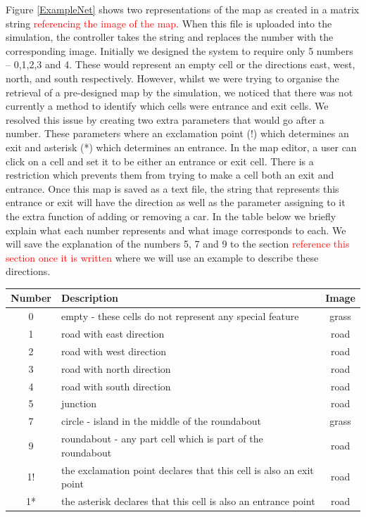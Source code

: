 \documentclass{article}
\begin{document}
Figure \ref{ExampleNet} shows two representations of the map as created in a matrix string \textcolor{red}{referencing the image of the map}. When this file is uploaded into the simulation, the controller takes the string and replaces the number with the corresponding image. Initially we designed the system to require only 5 numbers -- 0,1,2,3 and 4. These would represent an empty cell or the directions east, west, north, and south respectively. However, whilst we were trying to organise the retrieval  of a pre-designed map by the simulation, we noticed that there was not currently a method to identify which cells were entrance and exit cells. We resolved this issue by creating two extra parameters that would go after a number. These parameters where an exclamation point (!) which determines an exit and asterisk (*) which determines an entrance. In the map editor, a user can click on a cell and set it to be either an entrance or exit cell. There is a restriction which prevents them from trying to make a cell both an exit and entrance. Once this map is saved as a text file, the string that represents this entrance or exit will have the direction as well as the parameter assigning to it the extra function of adding or removing a car. In the table below we briefly explain what each number represents and what image corresponds to each. We will save the explanation of the numbers 5, 7 and 9 to the section \textcolor{red}{reference this section once it is written} where we will use an example to describe these directions. 

\vspace{0.5cm}
\begin{center}
\begin{tabular}{|c|l|c|}

\hline {\bf Number} & {\bf Description} & {\bf Image} \\ 
\hline 0 & empty - these cells do not represent any special feature & grass \\ 
\hline 1 & road with east direction & road \\ 
\hline 2 & road with west direction & road \\ 
\hline 3 & road with north direction & road \\ 
\hline 4 & road with south direction & road \\ 
\hline 5 & junction & road \\ 
\hline 7 & circle - island in the middle of the roundabout & grass \\ 
\hline 9 & roundabout - any part cell which is part of the roundabout & road \\ 
\hline 1! & the exclamation point declares that this cell is also an exit point & road \\
\hline 1* & the asterisk declares that this cell is also an entrance point & road \\ 
\hline
\end{tabular} 
\end{center} 	
\end{document}
